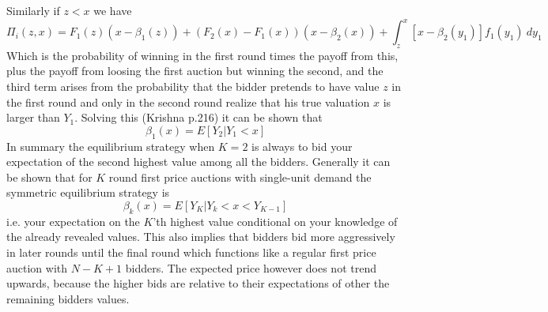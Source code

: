 Similarly if $z < x$ we have 
\begin{equation}
    \Pi_i(z,x) = F_1(z)(x-\beta_1(z)) + (F_2(x) - F_1(x))(x- \beta_2(x))  + \int_z^x [x - \beta_2(y_1)]f_1(y_1) \ d y_1    
\end{equation}
Which is the probability of winning in the first round times the payoff from this, plus the payoff from loosing the first auction but winning the second, and the third term arises from the probability that the bidder pretends to have value $z$ in the first round and only in the second round realize that his true valuation $x$ is larger than $Y_1$. Solving this (Krishna p.216) it can be shown that 
\begin{equation}
    \beta_1(x) = E[Y_2 |Y_1 < x]
\end{equation}
In summary the equilibrium strategy when $K=2$ is always to bid your expectation of the second highest value among all the bidders. Generally it can be shown that for $K$ round first price auctions with single-unit demand the symmetric equilibrium strategy is 
\begin{equation}
    \beta_k(x) = E[Y_K|Y_k < x <Y_{K-1}]
\end{equation}
i.e. your expectation on the $K$'th highest value conditional on your knowledge of the already revealed values. This also implies that bidders bid more aggressively in later rounds until the final round which functions like a regular first price auction with $N-K+1$ bidders. The expected price however does not trend upwards, because the higher bids are relative to their expectations of other the remaining bidders values. 